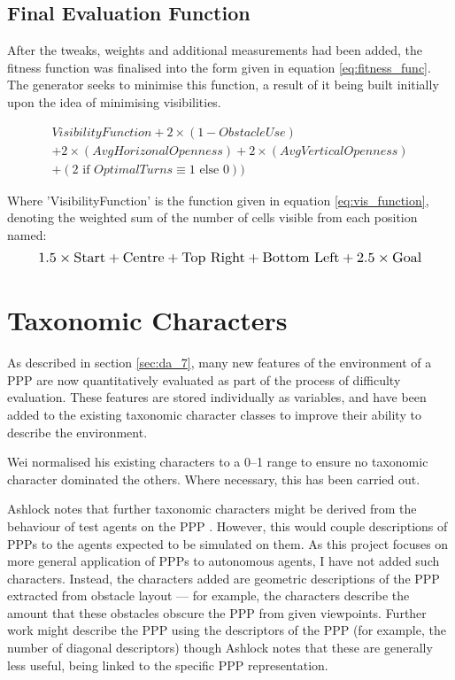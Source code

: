\documentclass[authoryearcitations]{UoYCSproject}
\begin{document}
\subsection{Final Evaluation Function}
\label{sec:function}
After the tweaks, weights and additional measurements had been added, the fitness function was finalised into the form given in equation \ref{eq:fitness_func}. The generator seeks to minimise this function, a result of it being built initially upon the idea of minimising visibilities.

\begin{multline}
VisibilityFunction + 2\times(1-ObstacleUse)\\ + 2\times(AvgHorizonalOpenness) + 2\times(AvgVerticalOpenness)\\+ (2 \text{ if } OptimalTurns \equiv 1 \text{ else } 0))
\label{eq:fitness_func}
\end{multline}

Where 'VisibilityFunction' is the function given in equation  \ref{eq:vis_function}, denoting the weighted sum of the number of cells visible from each position named:
\begin{equation}
\resizebox{0.9\textwidth}{!}{$
1.5 \times \text{Start}+\text{Centre}+\text{Top Right}+\text{Bottom Left}+2.5 \times \text{Goal}
$}
\label{eq:vis_function}
\end{equation}

\section{Taxonomic Characters}
\label{sec:taxchar_design}
As described in section \ref{sec:da_7}, many new features of the environment of a PPP are now quantitatively evaluated as part of the process of difficulty evaluation. These features are stored individually as variables, and have been added to the existing taxonomic character classes to improve their ability to describe the environment.

Wei normalised his existing characters to a 0--1 range to ensure no taxonomic character dominated the others. Where necessary, this has been carried out.

Ashlock notes that further taxonomic characters might be derived from the behaviour of test agents on the PPP \cite[section 7B]{ashlock}. However, this would couple descriptions of PPPs to the agents expected to be simulated on them. As this project focuses on more general application of PPPs to autonomous agents, I have not added such characters. Instead, the characters added are geometric descriptions of the PPP extracted from obstacle layout --- for example, the characters describe the amount that these obstacles obscure the PPP from given viewpoints. Further work might describe the PPP using the descriptors of the PPP (for example, the number of diagonal descriptors) though Ashlock notes that these are generally less useful, being linked to the specific PPP representation\cite[section 7B]{ashlock}.
\end{document}

